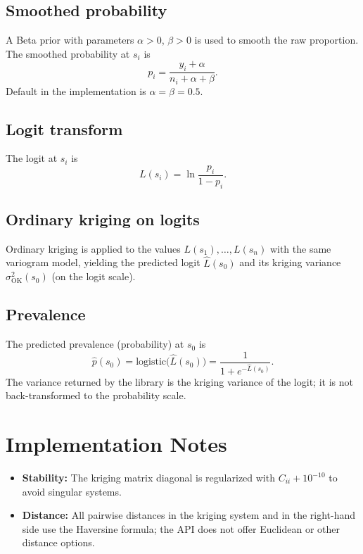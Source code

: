 \documentclass[11pt]{article}
\begin{document}
\subsection{Smoothed probability}
A Beta prior with parameters $\alpha > 0$, $\beta > 0$ is used to smooth the raw proportion. The smoothed probability at $s_i$ is
\begin{equation}
  p_i = \frac{y_i + \alpha}{n_i + \alpha + \beta}.
\end{equation}
Default in the implementation is $\alpha = \beta = 0.5$.

\subsection{Logit transform}
The logit at $s_i$ is
\begin{equation}
  L(s_i) = \ln\frac{p_i}{1 - p_i}.
\end{equation}

\subsection{Ordinary kriging on logits}
Ordinary kriging is applied to the values $L(s_1), \ldots, L(s_n)$ with the same variogram model, yielding the predicted logit $\hat{L}(s_0)$ and its kriging variance $\sigma_{\mathrm{OK}}^2(s_0)$ (on the logit scale).

\subsection{Prevalence}
The predicted prevalence (probability) at $s_0$ is
\begin{equation}
  \hat{p}(s_0) = \mathrm{logistic}\bigl(\hat{L}(s_0)\bigr) = \frac{1}{1 + e^{-\hat{L}(s_0)}}.
\end{equation}
The variance returned by the library is the kriging variance of the logit; it is not back-transformed to the probability scale.

\section{Implementation Notes}

\begin{itemize}
  \item \textbf{Stability:} The kriging matrix diagonal is regularized with $C_{ii} + 10^{-10}$ to avoid singular systems.
  \item \textbf{Distance:} All pairwise distances in the kriging system and in the right-hand side use the Haversine formula; the API does not offer Euclidean or other distance options.
\end{itemize}
\end{document}
